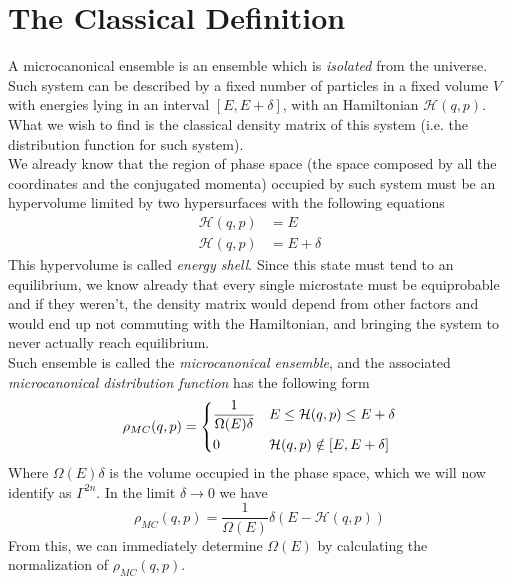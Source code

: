 \documentclass[a4paper, 11pt]{book}
\newcommand{\1}{\opr{\mathds{1}}}
\newcommand{\ham}{\mathcal{H}}
\theoremstyle{plain}
\begin{document}
		\section{The Classical Definition}
		A microcanonical ensemble is an ensemble which is \textit{isolated} from the universe.\\
		Such system can be described by a fixed number of particles in a fixed volume $V$ with energies lying in an interval $[E,E+\delta]$, with an Hamiltonian $\ham(q,p)$. What we wish to find is the classical density matrix of this system (i.e. the distribution function for such system).\\
		We already know that the region of phase space (the space composed by all the coordinates and the conjugated momenta) occupied by such system must be an hypervolume limited by two hypersurfaces with the following equations
		\begin{equation}
			\begin{aligned}
				\ham(q,p)&=E\\
				\ham(q,p)&=E+\delta
			\end{aligned}
			\label{eq:hypervolumeinphasespace}
		\end{equation}
		This hypervolume is called \textit{energy shell}. Since this state must tend to an equilibrium, we know already that every single microstate must be equiprobable and if they weren't, the density matrix would depend from other factors and would end up not commuting with the Hamiltonian, and bringing the system to never actually reach equilibrium.\\
		Such ensemble is called the \textit{microcanonical ensemble}, and the associated \textit{microcanonical distribution function} has the following form
		\begin{equation}
			\rho_{MC}(q,p)=\begin{dcases}
						\frac{1}{\Omega(E)\delta}&E\le\ham(q,p)\le E+\delta\\
						0&\ham(q,p)\notin[E,E+\delta]
					\end{dcases}
			\label{eq:microcanonicaldensity}
		\end{equation}
		Where $\Omega(E)\delta$ is the volume occupied in the phase space, which we will now identify as $\Gamma^{2n}$. In the limit $\delta\to0$ we have
		\begin{equation}
			\rho_{MC}(q,p)=\frac{1}{\Omega(E)}\delta\left( E-\ham(q,p) \right)
			\label{eq:rhomclimitdelta}
		\end{equation}
		From this, we can immediately determine $\Omega(E)$ by calculating the normalization of $\rho_{MC}(q,p)$.
\end{document}
